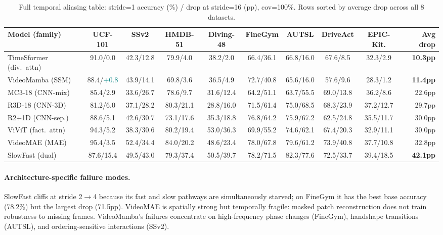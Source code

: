 \documentclass[runningheads]{llncs}
\newcommand{\tabtight}{\setlength{\tabcolsep}{3.5pt}\renewcommand{\arraystretch}{1.10}}
\begin{document}
\begin{table}[t]
\centering
\caption{Full temporal aliasing table: stride=1 accuracy (\%) / drop at stride=16 (pp), cov=100\%. Rows sorted by average drop across all 8 datasets.}
\label{tab:e1_full}
\scriptsize\tabtight
\begin{adjustbox}{max width=\textwidth}
\begin{tabular}{l @{\hskip4pt} cccccccc @{\hskip4pt} r}
\toprule
Model (family) & UCF-101 & SSv2 & HMDB-51 & Diving-48 & FineGym & AUTSL & DriveAct & EPIC-Kit. & Avg drop \\
\midrule
TimeSformer (div.\ attn) & 91.0/0.0 & 42.3/12.8 & 79.9/4.0 & 38.2/2.0 & 66.4/36.1 & 66.8/16.0 & 67.6/8.5 & 32.3/2.9 & \textbf{10.3pp} \\
VideoMamba (SSM)         & 88.4/\textcolor{teal}{+0.8} & 43.9/14.1 & 69.8/3.6 & 36.5/4.9 & 72.7/40.8 & 65.6/16.0 & 57.6/9.6 & 28.3/1.2 & \textbf{11.4pp} \\
\midrule
MC3-18 (CNN-mix)  & 85.4/2.9  & 33.6/26.7 & 78.6/9.7  & 31.6/12.4 & 64.2/51.1 & 63.7/55.5 & 69.0/13.8 & 36.2/8.6  & 22.6pp \\
R3D-18 (CNN-3D)   & 81.2/6.0  & 37.1/28.2 & 80.3/21.1 & 28.8/16.0 & 71.5/61.4 & 75.0/68.5 & 68.3/23.9 & 37.2/12.7 & 29.7pp \\
R2+1D (CNN-sep.)  & 88.6/5.1  & 42.6/30.7 & 73.1/17.6 & 35.3/18.8 & 76.8/64.2 & 75.9/67.2 & 62.5/24.8 & 35.5/11.7 & 30.0pp \\
ViViT (fact.\ attn) & 94.3/5.2 & 38.3/30.6 & 80.2/19.4 & 53.0/36.3 & 69.9/55.2 & 74.6/62.1 & 67.4/20.3 & 32.9/11.1 & 30.0pp \\
VideoMAE (MAE)    & 95.4/3.5  & 52.4/34.4 & 84.0/20.2 & 48.6/23.4 & 78.0/67.8 & 79.6/61.2 & 73.9/40.8 & 37.7/10.8 & 32.8pp \\
SlowFast (dual)   & 87.6/15.4 & 49.5/43.0 & 79.3/37.4 & 50.5/39.7 & 78.2/71.5 & 82.3/77.6 & 72.5/33.7 & 39.4/18.5 & \textbf{42.1pp} \\
\bottomrule
\end{tabular}
\end{adjustbox}
\end{table}

\paragraph{Architecture-specific failure modes.}
SlowFast cliffs at stride 2$\to$4 because its fast and slow pathways are simultaneously starved; on FineGym it has the best base accuracy (78.2\%) but the largest drop (71.5pp). VideoMAE is spatially strong but temporally fragile: masked patch reconstruction does not train robustness to missing frames. VideoMamba's failures concentrate on high-frequency phase changes (FineGym), handshape transitions (AUTSL), and ordering-sensitive interactions (SSv2).
\end{document}
